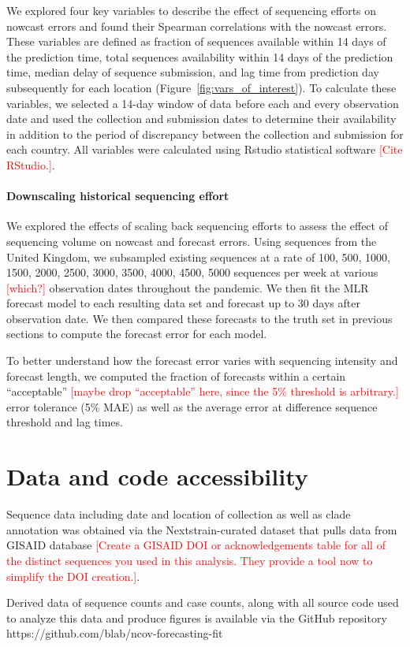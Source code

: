 \documentclass[11pt,oneside,letterpaper]{article}
\def\jhc#1{\textcolor{red}{[#1]}}
\begin{document}
We explored four key variables to describe the effect of sequencing efforts on nowcast errors and found their Spearman correlations with the nowcast errors.
These variables are defined as fraction of sequences available within 14 days of the prediction time, total sequences availability within 14 days of the prediction time, median delay of sequence submission, and lag time from prediction day subsequently for each location (Figure~\ref{fig:vars_of_interest}).
To calculate these variables, we selected a 14-day window of data before each and every observation date and used the collection and submission dates to determine their availability in addition to the period of discrepancy between the collection and submission for each country.
All variables were calculated using Rstudio statistical software \jhc{Cite RStudio.}.



\paragraph{Downscaling historical sequencing effort}

We explored the effects of scaling back sequencing efforts to assess the effect of sequencing volume on nowcast and forecast errors.
Using sequences from the United Kingdom, we subsampled existing sequences at a rate of 100, 500, 1000, 1500, 2000, 2500, 3000, 3500, 4000, 4500, 5000 sequences per week at various \jhc{which?} observation dates throughout the pandemic.
We then fit the MLR forecast model to each resulting data set and forecast up to 30 days after observation date.
We then compared these forecasts to the truth set in previous sections to compute the forecast error for each model.

To better understand how the forecast error varies with sequencing intensity and forecast length, we computed the fraction of forecasts within a certain ``acceptable'' \jhc{maybe drop ``acceptable'' here, since the 5\% threshold is arbitrary.} error tolerance (5\% MAE) as well as the average error at difference sequence threshold and lag times.


\section*{Data and code accessibility}

Sequence data including date and location of collection as well as clade annotation was obtained via the Nextstrain-curated
dataset that pulls data from GISAID database \jhc{Create a GISAID DOI or acknowledgements table for all of the distinct sequences you used in this analysis. They provide a tool now to simplify the DOI creation.}.


Derived data of sequence counts and case counts, along with all source code used to analyze
this data and produce figures is available via the GitHub repository https://github.com/blab/ncov-forecasting-fit




\end{document}
